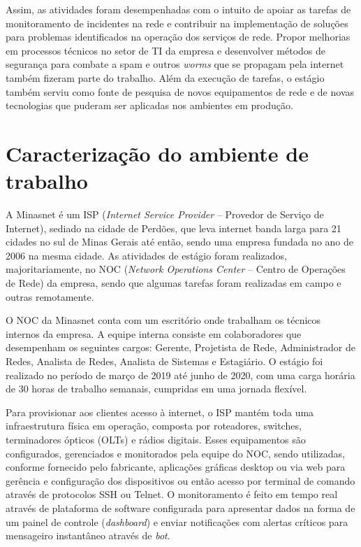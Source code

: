     Assim, as atividades foram desempenhadas com o intuito de apoiar as tarefas de monitoramento de incidentes na rede e contribuir na implementação de soluções para problemas identificados na operação dos serviços de rede. Propor melhorias em processos técnicos no setor de TI da empresa e desenvolver métodos de segurança para combate a spam e outros \textit{worms} que se propagam pela internet também fizeram parte do trabalho. Além da execução de tarefas, o estágio também serviu como fonte de pesquisa de novos equipamentos de rede e de novas tecnologias que puderam ser aplicadas nos ambientes em produção.

\section{Caracterização do ambiente de trabalho}

    A Minasnet é um ISP (\textit{Internet Service Provider} -- Provedor de Serviço de Internet), sediado na cidade de Perdões, que leva internet banda larga para 21 cidades no sul de Minas Gerais até então, sendo uma empresa fundada no ano de 2006 na mesma cidade. As atividades de estágio foram realizados, majoritariamente, no NOC (\textit{Network Operations Center} -- Centro de Operações de Rede) da empresa, sendo que algumas tarefas foram realizadas em campo e outras remotamente.

    O NOC da Minasnet conta com um escritório onde trabalham os técnicos internos da empresa. A equipe interna consiste em colaboradores que desempenham os seguintes cargos: Gerente, Projetista de Rede, Administrador de Redes, Analista de Redes, Analista de Sistemas e Estagiário. O estágio foi realizado no período de março de 2019 até junho de 2020, com uma carga horária de 30 horas de trabalho semanais, cumpridas em uma jornada flexível.

    Para provisionar aos clientes acesso à internet, o ISP mantém toda uma infraestrutura física em operação, composta por roteadores, switches, terminadores ópticos (OLTs) e rádios digitais. Esses equipamentos são configurados, gerenciados e monitorados pela equipe do NOC, sendo utilizadas, conforme fornecido pelo fabricante, aplicações gráficas desktop ou via web para gerência e configuração dos dispositivos ou então acesso por terminal de comando através de protocolos SSH ou Telnet. O monitoramento é feito em tempo real através de plataforma de software configurada para apresentar dados na forma de um painel de controle (\textit{dashboard}) e enviar notificações com alertas críticos para mensageiro instantâneo através de \textit{bot}.
    
